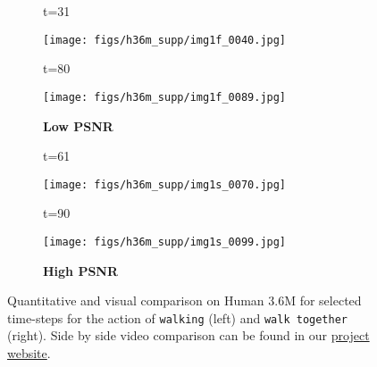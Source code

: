 \documentclass{article}
\begin{document}
\begin{appendix}
\begin{figure}[htb!]
    \centering
    \begin{subfigure}{0.40\linewidth}
        \caption*{t=31}
        \vspace{-9pt}
	    \texttt{[image: figs/h36m\_supp/img1f\_0040.jpg]}
  		\caption*{t=80}
        \vspace{-9pt}
  		\texttt{[image: figs/h36m\_supp/img1f\_0089.jpg]}
  		\caption*{\textbf{Low PSNR}}
	\end{subfigure}
	\hspace{10pt}
    \begin{subfigure}{0.40\linewidth}
        \caption*{t=61}
        \vspace{-9pt}
	    \texttt{[image: figs/h36m\_supp/img1s\_0070.jpg]}
  		\caption*{t=90}
        \vspace{-9pt}
  		\texttt{[image: figs/h36m\_supp/img1s\_0099.jpg]}
  		\caption*{\textbf{High PSNR}}
	\end{subfigure}
	\vspace{-.3cm}
    \caption{Quantitative and visual comparison on Human 3.6M for selected time-steps for the action of \texttt{walking} (left) and \texttt{walk together} (right). Side by side video comparison can be found in our \href{https://goo.gl/U7UOfy}{project website}.}
\label{fig:h36mbad1}
\vspace{-40pt}
\end{figure}


\end{appendix}
\end{document}
